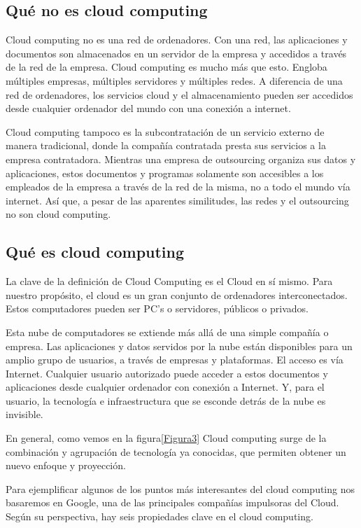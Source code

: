 \documentclass[runningheads]{llncs}
\begin{document}
\subsection{Qué no es cloud computing}

Cloud computing no es una red de ordenadores. Con una red, las aplicaciones  y documentos son almacenados en un servidor de la empresa 
y accedidos a través de la red de la empresa. Cloud computing es mucho más que esto. Engloba múltiples empresas, múltiples servidores y 
múltiples redes. A diferencia de una red de ordenadores, los servicios cloud y el almacenamiento pueden ser accedidos desde cualquier 
ordenador del mundo con una conexión a internet. 

Cloud computing tampoco es la subcontratación de un servicio externo de manera tradicional, donde la compañía contratada presta sus 
servicios a la empresa contratadora. Mientras una empresa de outsourcing organiza sus datos y aplicaciones, estos documentos y 
programas solamente son accesibles a los empleados de la empresa a través de la red de la misma, no a todo el mundo vía internet.
Así que, a pesar de las aparentes similitudes, las redes y el outsourcing no son cloud computing.


\subsection{Qué es cloud computing}

La clave de la definición de Cloud Computing es el Cloud en sí mismo. Para nuestro propósito, el cloud es un gran conjunto de ordenadores 
interconectados. Estos computadores pueden ser PC's o servidores, públicos o privados. 

Esta nube de computadores se extiende más allá de una simple compañía o empresa. Las aplicaciones y datos servidos por la nube están 
disponibles para un amplio grupo de usuarios, a través de empresas y plataformas. El acceso es vía Internet. Cualquier usuario autorizado 
puede acceder a estos documentos  y aplicaciones  desde cualquier ordenador con conexión a Internet. Y, para el usuario, la tecnología e 
infraestructura que se esconde detrás de la nube es invisible. 



En general, como vemos en la figura\ref{Figura3} Cloud computing surge de la combinación y agrupación de tecnología ya conocidas, que 
permiten obtener un nuevo enfoque y proyección.


Para ejemplificar algunos de los puntos más interesantes del cloud computing nos basaremos en Google, una de las principales 
compañías impulsoras del Cloud. Según su perspectiva, hay seis propiedades clave en el cloud computing.
\end{document}
